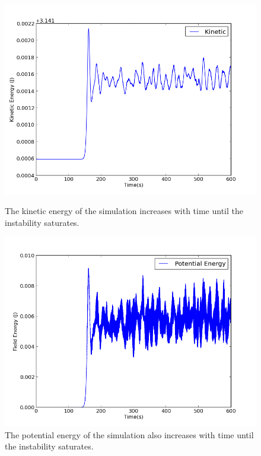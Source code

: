 \documentclass[12pt]{article}
\begin{document}
\begin{figure}[!hbt]   
\begin{minipage}[t]{0.35\textwidth}
\includegraphics[width=\linewidth]{KineticEnergy.png}
\caption{The kinetic energy of the simulation increases with time until the instability saturates.}
\label{fig:immediate}
\end{minipage}
\hspace{\fill}
\begin{minipage}[t]{0.35\textwidth}
\includegraphics[width=\linewidth]{FieldEnergy.png}
\caption{The potential energy of the simulation also increases with time until the instability saturates.}
\label{fig:proximal}
\end{minipage}


\end{figure}
\end{document}
